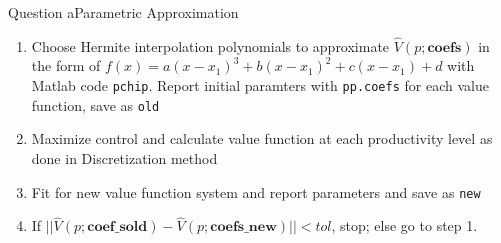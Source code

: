 \documentclass{beamer}
\begin{document}
\begin{frame}{Question a}{Parametric Approximation}
    \begin{enumerate}\addtocounter{enumi}{-1}
        \item Choose Hermite interpolation polynomials to approximate $\hat{V}(p;\textbf{coefs})$ in the form of \(
            f(x) = a (x-x_1)^3 + b(x-x_1)^2 + c(x-x_1)+d 
            \) with Matlab code \texttt{pchip}. Report initial paramters with \texttt{pp.coefs} for each value function, save as \texttt{old}
        \item Maximize control and calculate value function at each productivity level as done in Discretization method
        \item Fit for new value function system and report parameters and save as \texttt{new}
        \item If \(||\hat{V}(p;\textbf{coef\_sold})-\hat{V}(p;\textbf{coefs\_new})||<tol\), stop; else go to step 1.
    \end{enumerate}
\end{frame}

    

\end{document}
